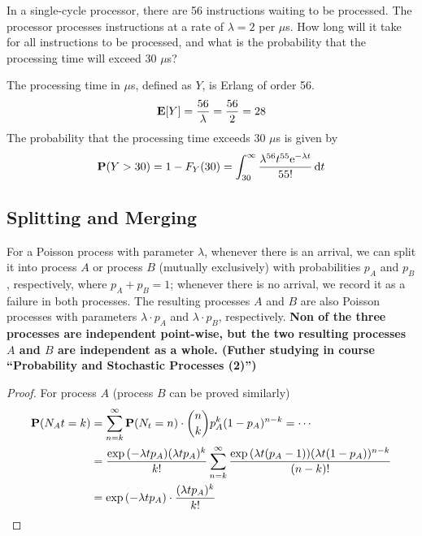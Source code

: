 \documentclass[device=normal, lang=en]{elegantbook}
\numberwithin{equation}{section}
\begin{document}
\begin{example}
    In a single-cycle processor, there are 56 instructions waiting to be processed. The processor processes instructions at a rate of $\lambda = 2$ per $\mu$s. How long will it take for all instructions to be processed, and what is the probability that the processing time will exceed 30 $\mu$s?
\end{example}
\begin{solution}
    The processing time in $\mu$s, defined as $Y$, is Erlang of order 56.
    \begin{equation}
        \mathbf{E}[Y] = \frac{56}{\lambda} = \frac{56}{2} = 28
    \end{equation}
    The probability that the processing time exceeds 30 $\mu$s is given by
    \begin{equation}
        \mathbf{P}(Y > 30) = 1 - F_Y(30) = \int_{30}^{\infty} \frac{\lambda^{56} t^{55} \mathrm{e}^{-\lambda t}}{55!} \dd{t}
    \end{equation}
\end{solution}

\subsection{Splitting and Merging}
For a Poisson process with parameter $\lambda$, whenever there is an arrival, we can split it into process $A$ or process $B$ (mutually exclusively) with probabilities $p_A$ and $p_B$, respectively, where $p_A + p_B = 1$; whenever there is no arrival, we record it as a failure in both processes. The resulting processes $A$ and $B$ are also Poisson processes with parameters $\lambda \cdot p_A$ and $\lambda \cdot p_B$, respectively. \textbf{Non of the three processes are independent point-wise, but the two resulting processes $A$ and $B$ are independent as a whole. (Futher studying in course ``Probability and Stochastic Processes (2)'')}
\begin{proof}
    For process $A$ (process $B$ can be proved similarly)
    \begin{equation}
    \begin{aligned}
        \mathbf{P}(N_At = k) &= \sum_{n=k}^{\infty} \mathbf{P}(N_t = n) \cdot \binom{n}{k} p_A^k (1-p_A)^{n-k} = \cdots \\ 
        &= \frac{\exp\qty(-\lambda t p_A)(\lambda t p_A)^k}{k!} \sum_{n=k}^{\infty} \frac{\exp\qty(\lambda t(p_A-1)) (\lambda t(1-p_A))^{n-k}}{(n-k)!} \\ 
        &= \exp\qty(-\lambda t p_A) \cdot \frac{(\lambda t p_A)^k}{k!}
    \end{aligned}
    \end{equation}
\end{proof}
\end{document}

